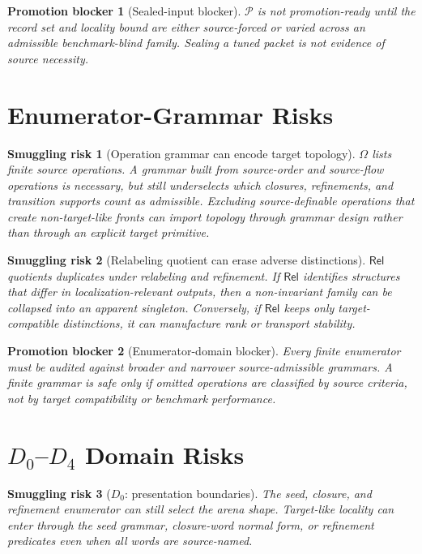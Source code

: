 \documentclass[11pt]{article}
\newcommand{\Pack}{\mathcal{P}}
\newcommand{\Rel}{\mathsf{Rel}}
\newtheorem{smugglingrisk}{Smuggling risk}
\newtheorem{promotionblocker}{Promotion blocker}
\begin{document}
\begin{promotionblocker}[Sealed-input blocker]
\(\Pack\) is not promotion-ready until the record set and locality bound are
either source-forced or varied across an admissible benchmark-blind family.
Sealing a tuned packet is not evidence of source necessity.
\end{promotionblocker}

\section{Enumerator-Grammar Risks}

\begin{smugglingrisk}[Operation grammar can encode target topology]
\(\Omega\) lists finite source operations. A grammar built from
source-order and source-flow operations is necessary, but still
underselects which closures, refinements, and transition supports count as
admissible. Excluding source-definable operations that create non-target-like
fronts can import topology through grammar design rather than through an
explicit target primitive.
\end{smugglingrisk}

\begin{smugglingrisk}[Relabeling quotient can erase adverse distinctions]
\(\Rel\) quotients duplicates under relabeling and refinement. If \(\Rel\)
identifies structures that differ in localization-relevant outputs, then a
non-invariant family can be collapsed into an apparent singleton. Conversely,
if \(\Rel\) keeps only target-compatible distinctions, it can manufacture
rank or transport stability.
\end{smugglingrisk}

\begin{promotionblocker}[Enumerator-domain blocker]
Every finite enumerator must be audited against broader and narrower
source-admissible grammars. A finite grammar is safe only if omitted
operations are classified by source criteria, not by target compatibility or
benchmark performance.
\end{promotionblocker}

\section{\texorpdfstring{\(D_0\)}{D0}--\texorpdfstring{\(D_4\)}{D4} Domain Risks}

\begin{smugglingrisk}[\(D_0\): presentation boundaries]
The seed, closure, and refinement enumerator can still select the arena
shape. Target-like locality can enter through the seed grammar, closure-word
normal form, or refinement predicates even when all words are source-named.
\end{smugglingrisk}
\end{document}
